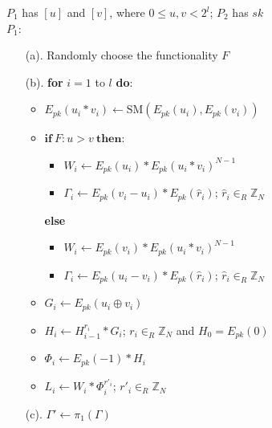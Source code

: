 \documentclass{article}
\begin{document}
\begin{algorithm}[!t]
\begin{algorithmic}[1]
\REQUIRE $P_1$ has $[u]$ and $[v]$, where $0 \leq u,v < 2^l$; $P_2$ has $sk$\\
\STATE $P_1$:
\begin{enumerate}\itemsep=0pt
        \item[(a).] Randomly choose the functionality $F$
        \item[(b).]  \textbf{for} $i=1$ to $l$ \textbf{do}:
                  \begin{itemize}\itemsep=0pt
                           \item $E_{pk}(u_i*v_i) \gets \textrm{SM}(E_{pk}(u_i), E_{pk}(v_i))$  
                           \item $\textbf{if}~F : u > v ~\textbf{then}$:
                           \begin{itemize}\itemsep=0pt                              
                              \item $W_i \gets E_{pk}(u_i)\ast E_{pk}(u_i\ast v_i)^{N-1}$                               
                              \item $\Gamma_i \gets E_{pk}(v_i-u_i)\ast E_{pk}(\hat{r}_i)$; $\hat{r}_i \in_{R}\mathbb{Z}_{N}$
                           \end{itemize}
                               \textbf{else} 
                           \begin{itemize}\itemsep=0pt                               
                              \item $W_i \gets E_{pk}(v_i)\ast E_{pk}(u_i\ast v_i)^{N-1}$                                 
                              \item $\Gamma_i \gets E_{pk}(u_i-v_i)\ast E_{pk}(\hat{r}_i)$; $\hat{r}_i \in_{R}\mathbb{Z}_{N}$ 
                           \end{itemize}
                           \item $G_i \gets E_{pk}(u_i\oplus v_i)$
                           \item $H_i \gets H_{i-1}^{r_i} \ast G_i$; $r_i \in_{R}\mathbb{Z}_{N}$ and $H_0 = E_{pk}(0)$ 
                           \item $\Phi_i \gets E_{pk}(-1)\ast H_i$  
                           \item $L_i \gets W_i \ast \Phi_i^{r'_i}$; $r'_i \in_{R} \mathbb{Z}_{N}$  
                  \end{itemize}
    \item[(c).]  $\Gamma' \gets \pi_1(\Gamma)$  

\end{enumerate}
\end{algorithmic}
\end{algorithm}
\end{document}
